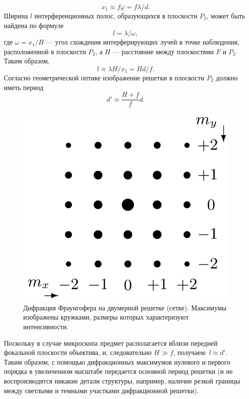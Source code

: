 \documentclass[a4paper, 12pt]{article}
\begin{document}
	\begin{equation}
		x_1\approx f\varphi=f\lambda/d.
	\end{equation}
	Ширина $l$ интерференционных полос, образующихся в плоскости $P_2$, может быть найдена по формуле
	\begin{equation}
		l=\lambda/\omega,
	\end{equation}
	где $\omega=x_1/H$ — угол схождения интерферирующих лучей в точке наблюдения, расположенной в плоскости $P_2$, а $H$ — расстояние между плоскостями $F$ и $P_2$. Таким образом,
	\begin{equation}
		l\approx\lambda H/x_1=Hd/f.
	\end{equation}
	Согласно геометрической оптике изображение решетки в плоскости $P_2$ должно иметь период
	\begin{equation}
		d'\approx\frac{H+f}{f}d.
	\end{equation}
	\begin{figure}
		\includegraphics[scale=0.2]{fig4.png}
		\caption{Дифракция Фраунгофера на двумерной решетке (сетке). Максимумы изображены кружками, размеры которых характеризуют интенсивности.}
		\label{fig:4}
	\end{figure}
	Поскольку в случае микроскопа предмет располагается вблизи передней фокальной плоскости объектива, и, следовательно $H\gg f$, получаем: $l\approx d'$. Таким образом, с помощью дифракционных максимумов нулевого и первого порядка в увеличенном масштабе передается основной период решетки (и не воспроизводятся никакие детали структуры, например, наличие резкой границы между светлыми и темными участками дифракционной решетки).\par
\end{document}
